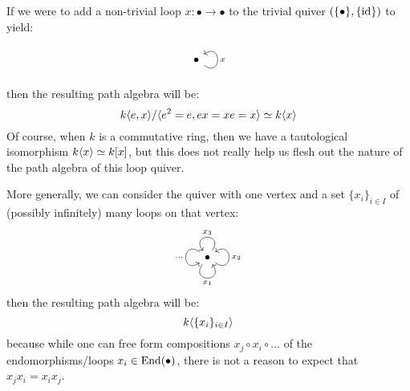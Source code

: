             \begin{example}
                If we were to add a non-trivial loop $x: \bullet \to \bullet$ to the trivial quiver $(\{\bullet\}, \{\mathrm{id}\})$ to yield:
                    $$
                        \begin{tikzcd}
                            \bullet \arrow["x"', loop, distance=2em, in=35, out=325]
                        \end{tikzcd}
                    $$
                then the resulting path algebra will be:
                    $$k\langle e, x\rangle/\langle e^2 = e, ex = xe = x\rangle \simeq k\langle x\rangle$$
                Of course, when $k$ is a commutative ring, then we have a tautological isomorphism $k\langle x\rangle \simeq k[x]$, but this does not really help us flesh out the nature of the path algebra of this loop quiver.
                    
                More generally, we can consider the quiver with one vertex and a set $\{x_i\}_{i \in I}$ of (possibly infinitely) many loops on that vertex:
                    $$
                        \begin{tikzcd}
                            \bullet \arrow["x_1"', loop, distance=2em, in=305, out=235] \arrow["x_2"', loop, distance=2em, in=35, out=325] \arrow["x_3"', loop, distance=2em, in=125, out=55] \arrow["\cdots"', loop, distance=2em, in=215, out=145]
                        \end{tikzcd}
                    $$
                then the resulting path algebra will be:
                    $$k\langle\{x_i\}_{i \in I}\rangle$$
                because while one can free form compositions $x_j \circ x_i \circ ...$ of the endomorphisms/loops $x_i \in \mathrm{End}(\bullet)$, there is not a reason to expect that $x_j x_i = x_i x_j$. 
            \end{example}
